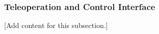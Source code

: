 
\subsubsection{Teleoperation and Control Interface}
\label{subsubsec:design_2_8_3_teleoperation_control_interface}

[Add content for this subsection.]
